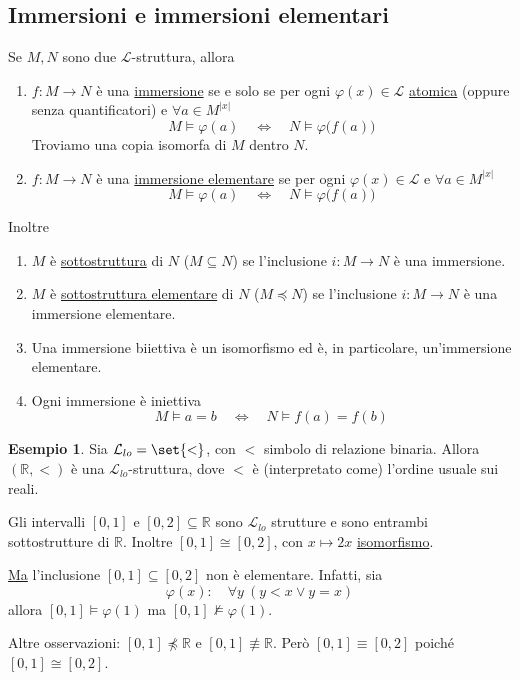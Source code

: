 \documentclass[10pt]{article}
\newcommand{\1}{\mathds{1}}
\newcommand{\R}{\mathds{R}}
\theoremstyle{definition}%
\newtheorem{esempio}[thm]{Esempio}
\theoremstyle{plain}
\theoremstyle{remark}
\begin{document}
\subsection{Immersioni e immersioni elementari}
\label{sec:org9c2fbb8}

Se \(M,N\) sono due \(\mathcal{L}\)-struttura, allora
\begin{enumerate}
\item \(f:M\to N\) è una \uline{immersione} se e solo se per ogni \(\varphi(x) \in \mathcal{L}\) \uline{atomica} (oppure senza quantificatori) e \(\forall a \in M^{|x|}\)
\begin{equation*}
 	M\vDash\varphi(a)\quad\iff\quad N\vDash \varphi\big(f(a)\big)
\end{equation*}
Troviamo una copia isomorfa di \(M\) dentro \(N\).
\item \(f:M\to N\) è una \uline{immersione elementare} se per ogni \(\varphi(x) \in \mathcal{L}\) e \(\forall a \in M^{|x|}\)
\begin{equation*}
 	M\vDash\varphi(a)\quad\iff\quad N\vDash \varphi\big(f(a)\big)
\end{equation*}
\end{enumerate}

Inoltre
\begin{enumerate}
\item \(M\) è \uline{sottostruttura} di \(N\) (\(M \subseteq N\)) se l'inclusione \(i:M\to N\) è una immersione.
\item \(M\) è \uline{sottostruttura elementare} di \(N\) (\(M \preceq N\)) se l'inclusione \(i:M\to N\) è una immersione elementare.
\item Una immersione biiettiva è un isomorfismo ed è, in particolare, un'immersione elementare.
\item Ogni immersione è iniettiva
\begin{equation*}
 	M\vDash a=b\quad\iff\quad N\vDash f(a)=f(b)
\end{equation*}
\end{enumerate}

\begin{esempio}
Sia \(\mathcal{L}_{lo}=\set{<}\), con \(<\) simbolo di relazione binaria. Allora \((\R,<)\) è una \(\mathcal{L}_{lo}\)-struttura, dove \(<\) è (interpretato come) l'ordine usuale sui reali.

Gli intervalli \([0,1]\) e \([0,2] \subseteq \R\) sono \(\mathcal{L}_{lo}\) strutture e sono entrambi sottostrutture di \(\R\). Inoltre \([0,1]\cong [0,2]\), con \(x\mapsto 2x\) \href{../../../../org/roam/20250131103053-morfismo_tra_strutture_del_prim_ordine.org}{isomorfismo}.

\uline{Ma} l'inclusione \([0,1]\subseteq[0,2]\) non è elementare. Infatti, sia
\begin{equation*}
\varphi(x):\quad \forall y \ (y<x \lor y=x)
\end{equation*}
allora \([0,1]\vDash\varphi(1)\) ma \([0,1]\not\vDash\varphi(1)\).

Altre osservazioni: \([0,1]\not\preceq \R\) e \([0,1]\not\equiv \R\). Però \([0,1]\equiv[0,2]\) poiché \([0,1]\cong[0,2]\).
\end{esempio}
\end{document}
